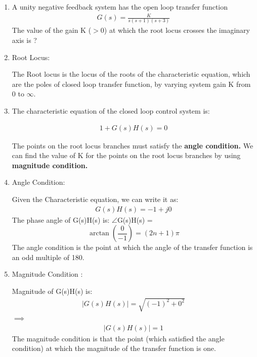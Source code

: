 \begin{enumerate}[label=\thesection.\arabic*.,ref=\thesection.\theenumi]
\item A unity negative feedback system has the open loop transfer function \\
\begin{align}
    G(s) = \frac{K}{s(s+1)(s+3)} 
    \label{eq:t1}
\end{align}
The value of the gain K ($>$0) at which the root locus crosses the imaginary axis is ?

\solution

\item Root Locus: 

	  The Root locus is the locus of the roots of the characteristic equation, which are the poles of closed loop transfer function, by varying system gain K from $0$ to $\infty$.

\item The characteristic equation of the closed loop control system is: 

    \begin{align}
         1 + G(s)H(s) = 0    
    \end{align}
    
    The points on the root locus branches must satisfy the \textbf{angle condition.}
    We can find the value of K for the points on the root locus branches by using \textbf{magnitude condition.}

\item Angle Condition: 

    Given the Characteristic equation, we can write it as:
    \begin{align}
         G(s)H(s) = -1 + j0   
    \end{align}
    The phase angle of G(s)H(s) is:
    $\angle$G(s)H(s) =\[ \arctan(\frac{0}{-1}) = (2n+1)\pi\]
    The angle condition is the point at which the angle of the transfer function is an odd multiple of 180.
   
\item Magnitude Condition :

    Magnitude of G(s)H(s) is:
    \begin{align}
        |G(s)H(s)| = \sqrt{(-1)^2 + 0^2}
    \end{align}
    $\implies$
    \begin{align}
        |G(s)H(s)| =1 
    \end{align}
    The magnitude condition is that the point (which satisfied the angle condition) at which the magnitude of the transfer function is one.


\end{enumerate}
